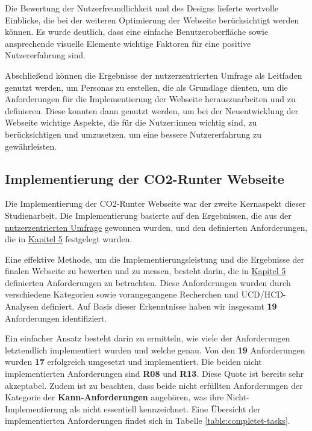 Die Bewertung der Nutzerfreundlichkeit und des Designs lieferte wertvolle Einblicke, die bei der weiteren Optimierung der Webseite berücksichtigt werden können. Es wurde deutlich, dass eine einfache Benutzeroberfläche sowie ansprechende visuelle Elemente wichtige Faktoren für eine positive Nutzererfahrung sind.

Abschließend können die Ergebnisse der nutzerzentrierten Umfrage als Leitfaden genutzt werden, um Personas zu erstellen, die als Grundlage dienten, um die Anforderungen für die Implementierung der Webseite herauszuarbeiten und zu definieren. Diese konnten dann genutzt werden, um bei der Neuentwicklung der Webseite wichtige Aspekte, die für die Nutzer:innen wichtig sind, zu berücksichtigen und umzusetzen, um eine bessere Nutzererfahrung zu gewährleisten.

\subsection{Implementierung der CO2-Runter Webseite}

Die Implementierung der CO2-Runter Webseite war der zweite Kernaspekt dieser Studienarbeit. Die Implementierung basierte auf den Ergebnissen, die aus der \hyperref[chapter:4]{nutzerzentrierten Umfrage} gewonnen wurden, und den definierten Anforderungen, die in \hyperref[chapter:5]{Kapitel 5} festgelegt wurden.

Eine effektive Methode, um die Implementierungsleistung und die Ergebnisse der finalen Webseite zu bewerten und zu messen, besteht darin, die in \hyperref[chapter:5]{Kapitel 5} definierten Anforderungen zu betrachten. Diese Anforderungen wurden durch verschiedene Kategorien sowie vorangegangene Recherchen und \acs{UCD}/\acs{HCD}-Analysen definiert. Auf Basis dieser Erkenntnisse haben wir insgesamt \textbf{19} Anforderungen identifiziert.

Ein einfacher Ansatz besteht darin zu ermitteln, wie viele der Anforderungen letztendlich implementiert wurden und welche genau. Von den \textbf{19} Anforderungen wurden \textbf{17} erfolgreich umgesetzt und implementiert. Die beiden nicht implementierten Anforderungen sind \textbf{R08} und \textbf{R13}. Diese Quote ist bereits sehr akzeptabel. Zudem ist zu beachten, dass beide nicht erfüllten Anforderungen der Kategorie der \textbf{Kann-Anforderungen} angehören, was ihre Nicht-Implementierung als nicht essentiell kennzeichnet. Eine Übersicht der implementierten Anforderungen findet sich in Tabelle \ref{table:completet-tasks}.

